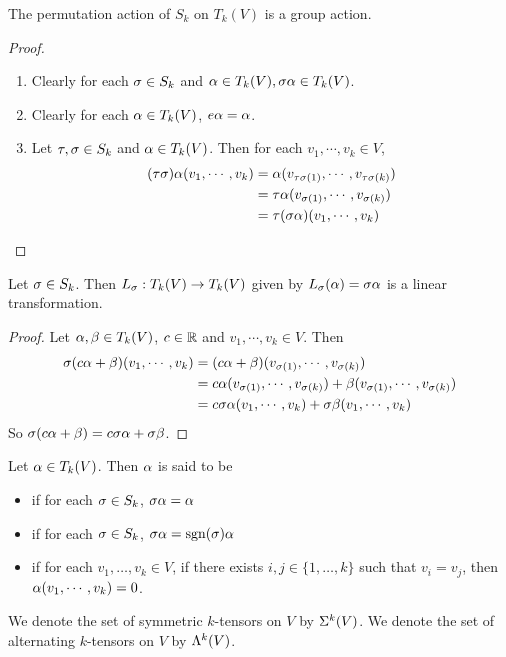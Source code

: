 \documentclass{book}
\begin{document}
	\begin{ex}
		The permutation action of $S_k$ on $T_k(V)$ is a group action.
	\end{ex}

	\begin{proof} \
		\begin{enumerate}
			\item Clearly for each $\sigma \in S_k$ and $\alpha \in T_k(V), \sigma \alpha \in T_k(V) $.
			\item Clearly for each $\alpha \in T_k(V)$, $e \alpha = \alpha$.
			\item Let $\tau, \sigma \in S_k$ and $\alpha \in T_k(V)$. Then for each $v_1, \cdots, v_k \in V$, 
			\begin{align*}
				(\tau \sigma) \alpha(v_1, \cdots, v_k) 
				& = \alpha(v_{\tau \sigma (1)}, \cdots, v_{\tau \sigma (k)}) \\
				& = \tau \alpha(v_{ \sigma (1)}, \cdots, v_{ \sigma (k)}) \\ 
				& = \tau (\sigma \alpha) (v_1, \cdots, v_k) 
			\end{align*}
		\end{enumerate}
	\end{proof}

	\begin{ex}
		Let $\sigma \in S_k$. Then $L_{\sigma}: T_k(V) \rightarrow T_k(V)$ given by $ L_{\sigma}(\alpha) = \sigma \alpha$ is a linear transformation.
	\end{ex}

	\begin{proof}
		Let $\alpha, \beta \in T_k(V)$, $c \in \mathbb{R}$ and $v_1, \cdots, v_k \in V$. Then 
		\begin{align*}
			\sigma(c\alpha + \beta)(v_1, \cdots, v_k) 
			& = (c\alpha + \beta)(v_{\sigma(1)}, \cdots, v_{\sigma(k)}) \\
			& = c \alpha(v_{\sigma(1)}, \cdots, v_{\sigma(k)}) + \beta(v_{\sigma(1)}, \cdots, v_{\sigma(k)}) \\
			& = c \sigma \alpha(v_1, \cdots, v_k) + \sigma \beta(v_1, \cdots, v_k)
		\end{align*}
		So $\sigma(c \alpha + \beta) = c\sigma \alpha + \sigma \beta$.
	\end{proof}
	
	\begin{defn}
		Let $\alpha \in T_k(V)$. Then $\alpha$ is said to be 
		\begin{itemize}
			\item {} if for each $\sigma \in S_k$, $\sigma \alpha = \alpha$
			\item {} if for each $\sigma \in S_k$, $\sigma \alpha = \operatorname{sgn}(\sigma) \alpha$
			\item \tbf{alternating} if for each $v_1, \ldots, v_k \in V$, if there exists $i,j \in \{1, \ldots, k\}$ such that $v_i = v_j$, then $\alpha(v_1, \cdots, v_k) = 0$.
		\end{itemize}
	We denote the set of symmetric $k$-tensors on $V$ by $\Sigma^k(V)$. We denote the set of  alternating $k$-tensors on $V$ by $\Lambda^k(V)$.
	\end{defn}
\end{document}
